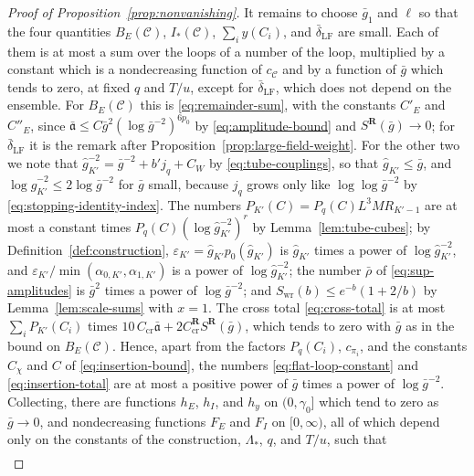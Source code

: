 \documentclass[11pt]{preprint}
\numberwithin{equation}{section}
\theoremstyle{definition}
\theoremstyle{remark}
\theoremstyle{plain}
\begin{document}
\begin{proof}[Proof of Proposition~\ref{prop:nonvanishing}]
It remains to choose $\bar g_1$ and $\ell$ so that the four quantities $B_E(\mathcal C)$, $I_*(\mathcal C)$, $\sum_iy(C_i)$, and $\bar\delta_{\mathrm{LF}}$ are small. Each of them is at most a sum over the loops of a number of the loop, multiplied by a constant which is a nondecreasing function of $c_{\mathcal C}$ and by a function of $\bar g$ which tends to zero, at fixed $q$ and $T/u$, except for $\bar\delta_{\mathrm{LF}}$, which does not depend on the ensemble. For $B_E(\mathcal C)$ this is \eqref{eq:remainder-sum}, with the constants $C'_E$ and $C''_E$, since $\bar{\mathfrak a} \leq C\bar g^2(\log\bar g^{-2})^{6p_0}$ by \eqref{eq:amplitude-bound} and $S^{\mathbf R}(\bar g) \to 0$; for $\bar\delta_{\mathrm{LF}}$ it is the remark after Proposition~\ref{prop:large-field-weight}. For the other two we note that $\hat g_{K'}^{-2} = \bar g^{-2} + b'j_q + C_W$ by \eqref{eq:tube-couplings}, so that $\hat g_{K'} \leq \bar g$, and $\log\hat g_{K'}^{-2} \leq 2\log\bar g^{-2}$ for $\bar g$ small, because $j_q$ grows only like $\log\log\bar g^{-2}$ by \eqref{eq:stopping-identity-index}. The numbers $P_{K'}(C) = P_q(C)L^3MR_{K'-1}$ are at most a constant times $P_q(C)(\log\hat g_{K'}^{-2})^r$ by Lemma~\ref{lem:tube-cubes}; by Definition~\ref{def:construction}, $\varepsilon_{K'} = \hat g_{K'}p_0(\hat g_{K'})$ is $\hat g_{K'}$ times a power of $\log\hat g_{K'}^{-2}$, and $\varepsilon_{K'}/\min(\alpha_{0,K'}, \alpha_{1,K'})$ is a power of $\log\hat g_{K'}^{-2}$; the number $\bar\rho$ of \eqref{eq:sup-amplitudes} is $\bar g^2$ times a power of $\log\bar g^{-2}$; and $S_{\mathrm{wr}}(b) \leq e^{-b}(1 + 2/b)$ by Lemma~\ref{lem:scale-sums} with $x = 1$. The cross total \eqref{eq:cross-total} is at most $\sum_iP_{K'}(C_i)$ times $10\,C_{\mathrm{cr}}\bar{\mathfrak a} + 2C^{\mathbf R}_{\mathrm{cr}}S^{\mathbf R}(\bar g)$, which tends to zero with $\bar g$ as in the bound on $B_E(\mathcal C)$. Hence, apart from the factors $P_q(C_i)$, $c_{\pi_i}$, and the constants $C_\chi$ and $C$ of \eqref{eq:insertion-bound}, the numbers \eqref{eq:flat-loop-constant} and \eqref{eq:insertion-total} are at most a positive power of $\bar g$ times a power of $\log\bar g^{-2}$. Collecting, there are functions $h_E$, $h_I$, and $h_y$ on $(0, \gamma_0]$ which tend to zero as $\bar g \to 0$, and nondecreasing functions $F_E$ and $F_I$ on $[0, \infty)$, all of which depend only on the constants of the construction, $\Lambda_*$, $q$, and $T/u$, such that
\begin{equation}\label{eq:nonvanishing-quantities}
\begin{gathered}

\end{gathered}
\end{equation}
\end{proof}
\end{document}
